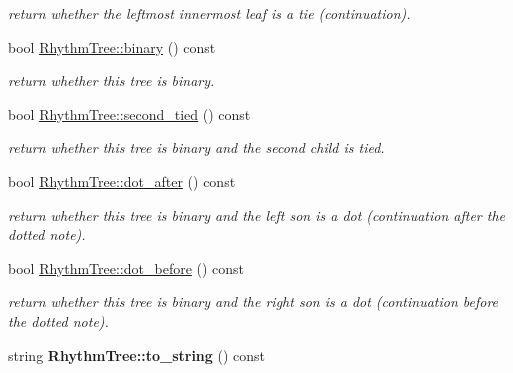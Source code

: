 \begin{DoxyCompactItemize}
\begin{DoxyCompactList}\small\item\em return whether the leftmost innermost leaf is a tie (continuation). \end{DoxyCompactList}\item 
\mbox{\label{group__output_gafb30d2c520e4c5e8600ae3a58abf9c72}} 
bool \mbox{\hyperlink{group__output_gafb30d2c520e4c5e8600ae3a58abf9c72}{Rhythm\+Tree\+::binary}} () const
\begin{DoxyCompactList}\small\item\em return whether this tree is binary. \end{DoxyCompactList}\item 
\mbox{\label{group__output_ga9aebdccd4ce1d1029d03f4ec38c101c4}} 
bool \mbox{\hyperlink{group__output_ga9aebdccd4ce1d1029d03f4ec38c101c4}{Rhythm\+Tree\+::second\+\_\+tied}} () const
\begin{DoxyCompactList}\small\item\em return whether this tree is binary and the second child is tied. \end{DoxyCompactList}\item 
\mbox{\label{group__output_gac785e6d945ef6e0808132459669ab038}} 
bool \mbox{\hyperlink{group__output_gac785e6d945ef6e0808132459669ab038}{Rhythm\+Tree\+::dot\+\_\+after}} () const
\begin{DoxyCompactList}\small\item\em return whether this tree is binary and the left son is a dot (continuation after the dotted note). \end{DoxyCompactList}\item 
\mbox{\label{group__output_ga2079bd534900d0b10e74682e404230b1}} 
bool \mbox{\hyperlink{group__output_ga2079bd534900d0b10e74682e404230b1}{Rhythm\+Tree\+::dot\+\_\+before}} () const
\begin{DoxyCompactList}\small\item\em return whether this tree is binary and the right son is a dot (continuation before the dotted note). \end{DoxyCompactList}\item 
\mbox{\label{group__output_gac6764688e24fe9b942464a9c2053ee92}} 
string {\bfseries Rhythm\+Tree\+::to\+\_\+string} () const

\end{DoxyCompactItemize}
